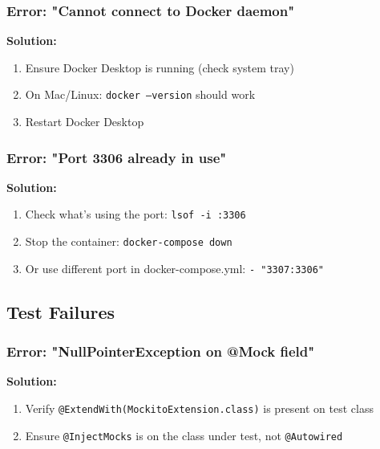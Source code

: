 \documentclass[12pt,a4paper]{article}
\begin{document}
\subsubsection{Error: "Cannot connect to Docker daemon"}

\begin{warningbox}
\textbf{Solution:}
\begin{enumerate}
    \item Ensure Docker Desktop is running (check system tray)
    \item On Mac/Linux: \texttt{docker --version} should work
    \item Restart Docker Desktop
\end{enumerate}
\end{warningbox}

\subsubsection{Error: "Port 3306 already in use"}

\begin{warningbox}
\textbf{Solution:}
\begin{enumerate}
    \item Check what's using the port: \texttt{lsof -i :3306}
    \item Stop the container: \texttt{docker-compose down}
    \item Or use different port in docker-compose.yml: \texttt{- "3307:3306"}
\end{enumerate}
\end{warningbox}

\subsection{Test Failures}

\subsubsection{Error: "NullPointerException on @Mock field"}

\begin{warningbox}
\textbf{Solution:}
\begin{enumerate}
    \item Verify \texttt{@ExtendWith(MockitoExtension.class)} is present on test class
    \item Ensure \texttt{@InjectMocks} is on the class under test, not \texttt{@Autowired}
\end{enumerate}
\end{warningbox}
\end{document}
